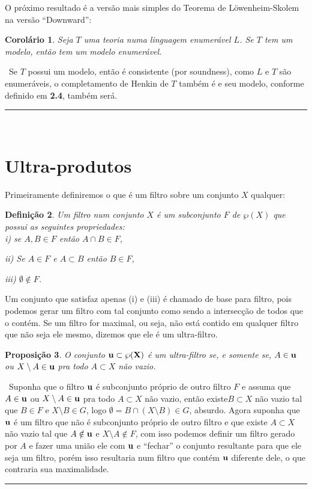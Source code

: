 \documentclass[11pt,a4paper]{article}
\newtheorem{mydef}{Definição}[section]
\newtheorem{cor}[mydef]{Corolário}
\newtheorem{prop}[mydef]{Proposição}
\def\dem{\par\smallbreak\noindent {\textit{ Demonstração:}} \ }
\def\eop{\hfill\rule{2.5mm}{2.5mm} \\ }
\theoremstyle{definition}
\begin{document}
O próximo resultado é a versão mais simples do Teorema de Löwenheim-Skolem na versão ``Downward'':

\begin{cor}
	
	Seja $T$ uma teoria numa linguagem enumerável $L$. Se $T$ tem um modelo, então tem um modelo enumerável. 
	
\end{cor}

\dem Se $T$ possui um modelo, então é consistente (por soundness), como $L$ e $T$ são enumeráveis, o completamento de Henkin de $T$ também é e seu modelo, conforme definido em \textbf{2.4}, também será. \eop


\section{Ultra-produtos}

Primeiramente definiremos o que é um filtro sobre um conjunto $X$ qualquer:

\begin{mydef}
	
	Um filtro num conjunto $X$ é um subconjunto $F$ de $\wp (X)$ que possui as seguintes propriedades: \\
	
	i) se $A,B\in F$ então $A\cap B\in F$,
	
	ii) Se $A\in F$ e $A\subset B$ então $B\in F$,
	
	iii) $\emptyset \notin F$.
	
\end{mydef}

Um conjunto que satisfaz apenas (i) e (iii) é chamado de base para filtro, pois podemos gerar um filtro com tal conjunto como sendo a intersecção de todos que o contém. Se um filtro for maximal, ou seja, não está contido em qualquer filtro que não seja ele mesmo, dizemos que ele é um ultra-filtro. 

\begin{prop}
	
	O conjunto $\bf{u}\subset \wp(X)$ é um ultra-filtro se, e somente se, $A\in \bf{u}$ ou $X\setminus A \in \bf{u}$ pra todo $A\subset X$ não vazio.
	
\end{prop}

\dem Suponha que o filtro $\bf{u}$ é subconjunto próprio de outro filtro $F$ e assuma que $A\in \bf{u}$ ou $X\setminus A \in \bf{u}$ pra todo $A\subset X$ não vazio, então existe$B \subset X$ não vazio tal que $B\in F$ e $X\setminus B\in G$, logo $\emptyset =B\cap (X\setminus B)\in G$, absurdo. Agora suponha que $\bf{u}$ é um filtro que não é subconjunto próprio de outro filtro e que existe $A\subset X$ não vazio tal que $A\notin \bf{u}$ e $X\setminus A \notin F$, com isso podemos definir um filtro gerado por $A$ e fazer uma união ele com $\bf{u}$ e ``fechar'' o conjunto resultante para que ele seja um filtro, porém isso resultaria num filtro que contém $\bf{u}$ diferente dele, o que contraria sua maximalidade. \eop
\end{document}

